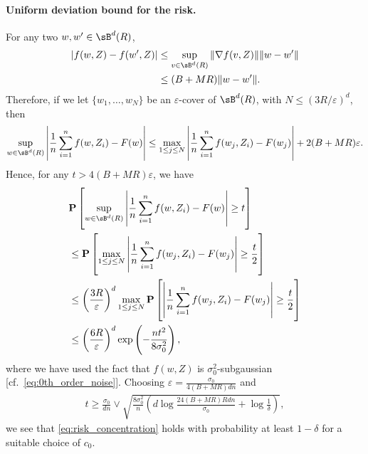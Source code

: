 \documentclass[final,12pt]{colt2018}
\numberwithin{equation}{section}
\numberwithin{equation}{section}
\def\PP{\mathbf{P}}
\def\eps{\varepsilon}
\begin{document}
\paragraph{Uniform deviation bound for the risk.} For any two $w,w' \in \sB^d(R)$, 
\begin{align*}
	|f(w,Z)-f(w',Z)| &\le \sup_{v \in \sB^d(R)} \|\nabla f(v,Z)\| \|w-w'\| \\
	&\le (B+MR)\|w-w'\|.
\end{align*}
Therefore, if we let $\{w_1,\ldots,w_N\}$ be an $\eps$-cover of $\sB^d(R)$, with $N \le (3R/\eps)^d$, then
\begin{align*}
	\sup_{w \in \sB^d(R)}\left| \frac{1}{n}\sum^n_{i=1} f(w,Z_i) -  F(w)\right| \le \max_{1 \le j \le N} \left|\frac{1}{n}\sum^n_{i=1} f(w_j,Z_i) -  F(w_j)\right| + 2(B+MR)\eps.
\end{align*}
Hence, for any $t > 4(B+MR)\eps$, we have
\begin{align*}
&	\PP\left[ \sup_{w \in \sB^d(R)}\left| \frac{1}{n}\sum^n_{i=1} f(w,Z_i) -  F(w)\right| \ge t \right] \\
&\le \PP\left[ \max_{1 \le j \le N}\left| \frac{1}{n}\sum^n_{i=1} f(w_j,Z_i) - F(w_j)\right| \ge \frac{t}{2} \right]  \\
&\le \left(\frac{3R}{\eps}\right)^d \max_{1 \le j \le N}\PP\left[\left|\frac{1}{n}\sum^n_{i=1}f(w_j,Z_i)-F(w_j)\right| \ge \frac{t}{2}\right] \\
&\le \left(\frac{6R}{\eps}\right)^d \exp\left(-\frac{nt^2}{8\sigma^2_0}\right),
\end{align*}
where we have used the fact that $f(w,Z)$ is $\sigma^2_0$-subgaussian [cf.~\eqref{eq:0th_order_noise}].
Choosing $\eps = \frac{\sigma_0}{4(B+MR)dn}$ and
\begin{align*}
	t \ge \frac{\sigma_0}{dn} \vee \sqrt{\frac{8\sigma^2_0}{n}\left(d \log \frac{24(B+MR)Rdn}{\sigma_0}+\log\frac{1}{\delta}\right)},
\end{align*}
we see that \eqref{eq:risk_concentration} holds with probability at least $1-\delta$ for a suitable choice of $c_0$.
\end{document}
